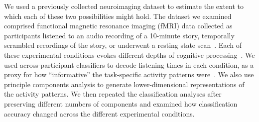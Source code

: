 \documentclass[english]{article}
\begin{document}
We used a previously collected neuroimaging dataset to estimate the extent to
which each of these two possibilities might hold. The dataset we examined
comprised functional magnetic resonance imaging (fMRI) data collected as
participants listened to an audio recording of a 10-minute story, temporally
scrambled recordings of the story, or underwent a resting state
scan~\citep{SimoEtal16}. Each of these experimental conditions evokes different
depths of cognitive processing~\citep{SimoEtal16,LernEtal11,
HassEtal08,OwenEtal21}. We used across-participant classifiers to decode
listening times in each condition, as a proxy for how ``informative'' the
task-specific activity patterns were~\citep{SimoChan20}. We also use principle
components analysis to generate lower-dimensional representations of the
activity patterns. We then repeated the classification analyses after
preserving different numbers of components and examined how classification
accuracy changed across the different experimental conditions.









\end{document}
